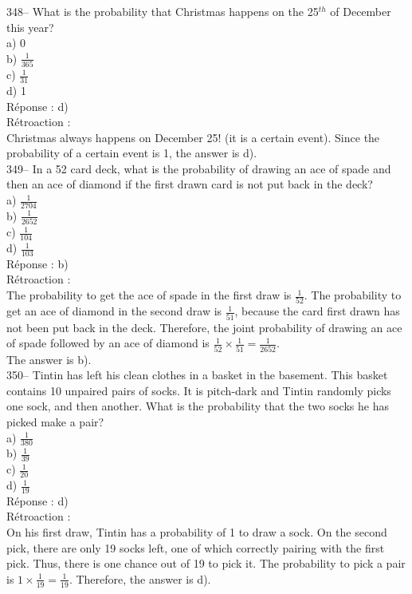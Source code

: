 \documentclass[letterpaper, 12pt]{article}
\begin{document}
348-- What is the probability that Christmas happens on the 25$^{th}$ of December this year?\\

a) 0\\[2mm]
b) $\frac{1}{365}$\\[2mm]
c) $\frac{1}{31}$\\[2mm]
d) 1\\

R\'eponse : d)\\

R\'etroaction : \\
Christmas always happens on December 25! (it is a certain event).
Since the probability of a certain event is 1, the answer is d).\\

349-- In a 52 card deck, what is the probability of drawing an ace of spade and then an ace of diamond if the first drawn card is not put back in the deck?\\

a) $\frac{1}{2704}$\\[2mm]
b) $\frac{1}{2652}$\\[2mm]
c) $\frac{1}{104}$\\[2mm]
d) $\frac{1}{103}$\\

R\'eponse : b)\\

R\'etroaction : \\
The probability to get the ace of spade in the first draw is
$\frac{1}{52}$. The probability to get an ace of diamond in the
second draw is $\frac{1}{51}$, because the card first drawn has not
been put back in the deck. Therefore, the joint probability of
drawing an ace of spade followed by an ace of diamond is
$\frac{1}{52}\times\frac{1}{51}=
\frac{1}{2652}$.\\
The answer is b).\\

350-- Tintin has left his clean clothes in a basket in the basement. This basket contains 10 unpaired pairs of socks.
It is pitch-dark and Tintin randomly picks one sock, and then another. What is the probability that the two socks he has picked make a pair?\\

a) $\frac{1}{380}$\\[2mm]
b) $\frac{1}{39}$\\[2mm]
c) $\frac{1}{20}$\\[2mm]
d) $\frac{1}{19}$\\

R\'eponse : d)\\

R\'etroaction : \\
On his first draw, Tintin has a probability of 1 to draw a sock. On the second pick, there are only 19 socks left, one of which correctly pairing with the first pick. Thus, there is one chance out of 19 to pick it. The probability to pick a pair is $1\times\frac{1}{19}=\frac{1}{19}$. Therefore, the answer is d).\\
\end{document}
